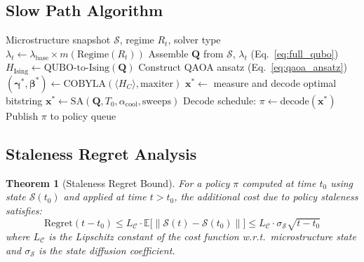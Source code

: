 \documentclass[11pt]{article}
\newcommand{\bx}{\mathbf{x}}
\newcommand{\bQ}{\mathbf{Q}}
\newcommand{\E}{\mathbb{E}}
\newtheorem{theorem}{Theorem}
\begin{document}
\subsection{Slow Path Algorithm}

\begin{algorithm}[t]
\caption{Slow Path: Optimization Cycle (100\,ms--5\,s)}
\label{alg:slow_path}
\begin{algorithmic}[1]
\REQUIRE Microstructure snapshot $\mathcal{S}$, regime $R_t$, solver type
\STATE $\lambda_t \leftarrow \lambda_{\mathrm{base}} \times m(\mathrm{Regime}(R_t))$
\STATE Assemble $\bQ$ from $\mathcal{S}$, $\lambda_t$ (Eq.~\ref{eq:full_qubo})
\STATE $H_{\mathrm{Ising}} \leftarrow \mathrm{QUBO\text{-}to\text{-}Ising}(\bQ)$ 
    \STATE Construct QAOA ansatz (Eq.~\ref{eq:qaoa_ansatz})
    \STATE $(\bm{\gamma}^*, \bm{\beta}^*) \leftarrow \mathrm{COBYLA}(\langle H_C \rangle, \mathrm{maxiter})$
    \STATE $\bx^* \leftarrow$ measure and decode optimal bitstring
\ELSE
    \STATE $\bx^* \leftarrow \mathrm{SA}(\bQ, T_0, \alpha_{\mathrm{cool}}, \mathrm{sweeps})$
\ENDIF
\STATE Decode schedule: $\pi \leftarrow \mathrm{decode}(\bx^*)$
\STATE Publish $\pi$ to policy queue
\end{algorithmic}
\end{algorithm}

\subsection{Staleness Regret Analysis}

\begin{theorem}[Staleness Regret Bound]
\label{thm:staleness}
For a policy $\pi$ computed at time $t_0$ using state $\mathcal{S}(t_0)$ and applied at time $t > t_0$, the additional cost due to policy staleness satisfies:
\begin{equation}
\mathrm{Regret}(t - t_0) \leq L_{\mathcal{C}} \cdot \E\big[\|\mathcal{S}(t) - \mathcal{S}(t_0)\|\big] \leq L_{\mathcal{C}} \cdot \sigma_{\mathcal{S}} \sqrt{t - t_0}
\end{equation}
where $L_{\mathcal{C}}$ is the Lipschitz constant of the cost function w.r.t.\ microstructure state and $\sigma_{\mathcal{S}}$ is the state diffusion coefficient.
\end{theorem}
\end{document}
